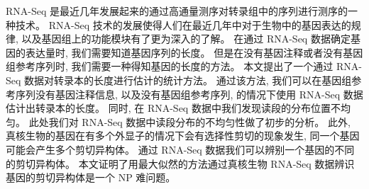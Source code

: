 
\secretlevel{} \secretyear{}

\makeatletter
\ifthu@bachelor\relax\else
  \ifthu@doctor
  \else
    \ifthu@master
    \fi
  \fi
\fi
\makeatother





\begin{cabstract}
	RNA-Seq 是最近几年发展起来的通过高通量测序对转录组中的序列进行测序的一种技术。 
	RNA-Seq 技术的发展使得人们在最近几年中对于生物中的基因表达的规律, 
	以及基因组上的功能模块有了更为深入的了解。 
	在通过 RNA-Seq 数据确定基因的表达量时, 我们需要知道基因序列的长度。 
	但是在没有基因注释或者没有基因组参考序列时, 我们需要一种得知基因的长度的方法。
	本文提出了一个通过 RNA-Seq 数据对转录本的长度进行估计的统计方法。 
	通过该方法, 我们可以在基因组参考序列没有基因注释信息, 以及没有基因组参考序列, 
	的情况下使用 RNA-Seq 数据估计出转录本的长度。
	同时, 在 RNA-Seq 数据中我们发现读段的分布位置不均匀。
	此处我们对 RNA-Seq 数据中读段分布的不均匀性做了初步的分析。
	此外, 真核生物的基因在有多个外显子的情况下会有选择性剪切的现象发生, 
	同一个基因可能会产生多个剪切异构体。
	通过 RNA-Seq 数据我们可以辨别一个基因的不同的剪切异构体。
	本文证明了用最大似然的方法通过真核生物 RNA-Seq 数据辨识基因的剪切异构体是一个 NP 难问题。
\end{cabstract}

